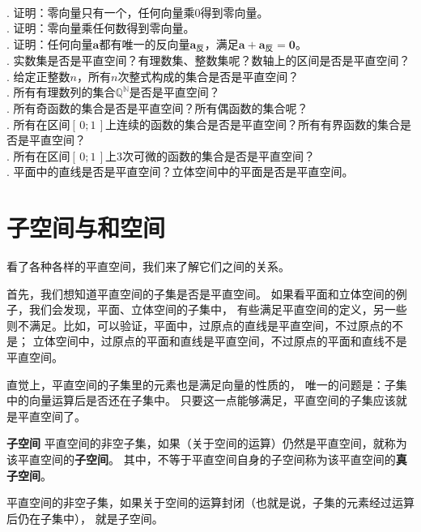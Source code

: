 \documentclass[12pt,UTF8]{ctexbook}
\begin{document}
\begin{xt}
    \mbox{} \\
    . 证明：零向量只有一个，任何向量乘$0$得到零向量。\\
    . 证明：零向量乘任何数得到零向量。\\
    . 证明：任何向量$\mathbf{a}$都有唯一的反向量$\mathbf{a}_{\text{反}}$，满足$\mathbf{a} + \mathbf{a}_{\text{反}} = \mathbf{0}$。\\
    . 实数集是否是平直空间？有理数集、整数集呢？数轴上的区间是否是平直空间？\\
    . 给定正整数$n$，所有$n$次整式构成的集合是否是平直空间？\\
    . 所有有理数列的集合$\mathbb{Q}^\mathbb{N}$是否是平直空间？\\
    . 所有奇函数的集合是否是平直空间？所有偶函数的集合呢？\\
    . 所有在区间$[\,0;1\,]$上连续的函数的集合是否是平直空间？所有有界函数的集合是否是平直空间？\\
    . 所有在区间$[\,0;1\,]$上$3$次可微的函数的集合是否是平直空间？\\
    . 平面中的直线是否是平直空间？立体空间中的平面是否是平直空间。
\end{xt}

\section{子空间与和空间}
看了各种各样的平直空间，我们来了解它们之间的关系。

首先，我们想知道平直空间的子集是否是平直空间。
如果看平面和立体空间的例子，我们会发现，平面、立体空间的子集中，
有些满足平直空间的定义，另一些则不满足。比如，可以验证，平面中，过原点的直线是平直空间，不过原点的不是；
立体空间中，过原点的平面和直线是平直空间，不过原点的平面和直线不是平直空间。

直觉上，平直空间的子集里的元素也是满足向量的性质的，
唯一的问题是：子集中的向量运算后是否还在子集中。
只要这一点能够满足，平直空间的子集应该就是平直空间了。

\begin{df}{\textbf{子空间}}
    平直空间的非空子集，如果（关于空间的运算）仍然是平直空间，就称为该平直空间的\textbf{子空间}。
    其中，不等于平直空间自身的子空间称为该平直空间的\textbf{真子空间}。
\end{df}

\begin{tm}
    平直空间的非空子集，如果关于空间的运算封闭（也就是说，子集的元素经过运算后仍在子集中），
    就是子空间。
\end{tm}
\end{document}
